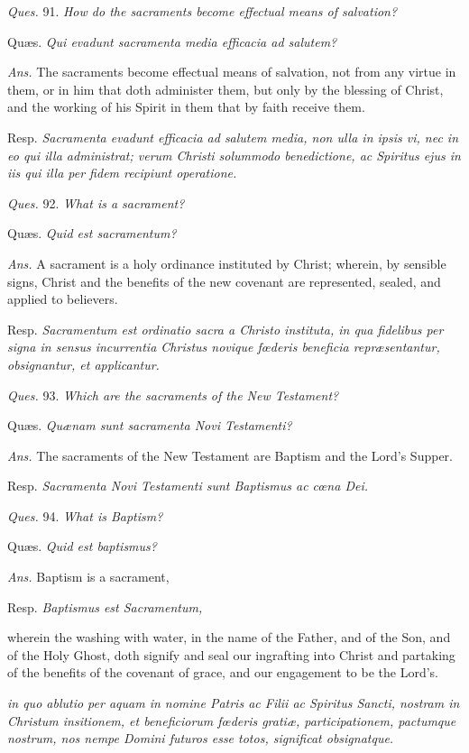 \emph{Ques.} 91. \emph{How do the sacraments become effectual means of salvation?}

Quæs. \emph{Qui evadunt sacramenta media efficacia ad salutem?}

\emph{Ans.} The sacraments become effectual means of salvation, not from any virtue in them, or in him that doth administer them, but only by the blessing of Christ, and the working of his Spirit in them that by faith receive them.

Resp. \emph{Sacramenta evadunt efficacia ad salutem media, non ulla in ipsis vi, nec in eo qui illa administrat; verum Christi solummodo benedictione, ac Spiritus ejus in iis qui illa per fidem recipiunt operatione.}

\emph{Ques.} 92. \emph{What is a sacrament?}

Quæs. \emph{Quid est sacramentum?}

\emph{Ans.} A sacrament is a holy ordinance instituted by Christ; wherein, by sensible signs, Christ and the benefits of the new covenant are represented, sealed, and applied to believers.

Resp. \emph{Sacramentum est ordinatio sacra a Christo instituta, in qua fidelibus per signa in sensus incurrentia Christus novique fœderis beneficia repræsentantur, obsignantur, et applicantur.}

\emph{Ques.} 93. \emph{Which are the sacraments of the New Testament?}

Quæs. \emph{Quænam sunt sacramenta Novi Testamenti?}

\emph{Ans.} The sacraments of the New Testament are Baptism and the Lord's Supper.

Resp. \emph{Sacramenta Novi Testamenti sunt Baptismus ac cœna Dei.}

\emph{Ques.} 94. \emph{What is Baptism?}

Quæs. \emph{Quid est baptismus?}

\emph{Ans.} Baptism is a sacrament,

Resp. \emph{Baptismus est Sacramentum, }

wherein the washing with water, in the name of the Father, and of the Son, and of the Holy Ghost, doth signify and seal our ingrafting into Christ and partaking of the benefits of the covenant of grace, and our engagement to be the Lord's.

\emph{in quo ablutio per aquam in nomine Patris ac Filii ac Spiritus Sancti, nostram in Christum insitionem, et beneficiorum fœderis gratiæ, participationem, pactumque nostrum, nos nempe Domini futuros esse totos, significat obsignatque.}

